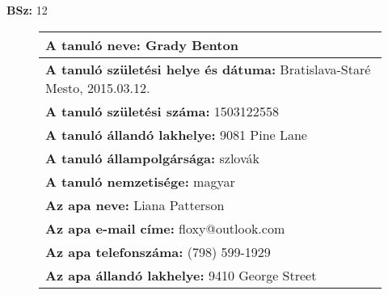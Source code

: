 \documentclass[10pt,a4paper]{article}
\begin{document}
    \vfill
    \textbf{BSz: }12
\newpage
    \begin{figure}[!ht]
    \begin{tabular}{|m{\textwidth}|}
    \hline \vspace{3pt}
    \textbf{A tanuló neve:} \hspace{0.5cm} Grady Benton \vspace{3pt} \\
\hline\vspace{3pt}
\textbf{A tanuló születési helye és dátuma:} \hspace{0.5cm} Bratislava-Staré Mesto, 2015.03.12. \vspace{3pt} \\
\hline\vspace{3pt}
\textbf{A tanuló születési száma:} \hspace{0.5cm} 1503122558 \vspace{3pt} \\
\hline\vspace{3pt}
\textbf{A tanuló állandó lakhelye:} \hspace{0.5cm} 9081 Pine Lane \vspace{3pt} \\
\hline\vspace{3pt}
\textbf{A tanuló állampolgársága:} \hspace{0.5cm} szlovák \vspace{3pt} \\
\hline\vspace{3pt}
\textbf{A tanuló nemzetisége:} \hspace{0.5cm} magyar \vspace{3pt} \\
\hline\vspace{3pt}
\textbf{Az apa neve:} \hspace{0.5cm} Liana Patterson \vspace{3pt} \\
\hline\vspace{3pt}
\textbf{Az apa e-mail címe:} \hspace{0.5cm} floxy@outlook.com \vspace{3pt} \\
\hline\vspace{3pt}
\textbf{Az apa telefonszáma:} \hspace{0.5cm} (798) 599-1929 \vspace{3pt} \\
\hline\vspace{3pt}
\textbf{Az apa állandó lakhelye:} \hspace{0.5cm} 9410 George Street \vspace{3pt} \\

\end{tabular}
\end{figure}
\end{document}
